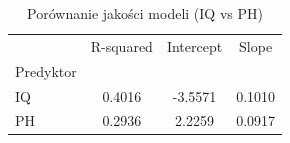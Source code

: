 \begin{table}[H]
\caption{Porównanie jakości modeli (IQ vs PH)}
\label{tab:zad2_comp}
\begin{tabular}{lccc}
\toprule
 & R-squared & Intercept & Slope \\
Predyktor &  &  &  \\
\midrule
IQ & 0.4016 & -3.5571 & 0.1010 \\
PH & 0.2936 & 2.2259 & 0.0917 \\
\bottomrule
\end{tabular}
\end{table}
